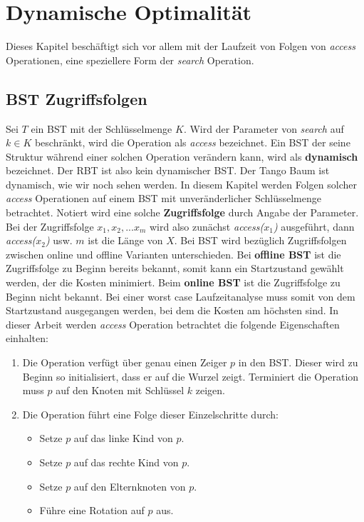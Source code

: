 \documentclass[a4paper,12pt]{article}
\begin{document}
\section{Dynamische Optimalität}
Dieses Kapitel beschäftigt sich vor allem mit der Laufzeit von Folgen von \textit{access} Operationen, eine speziellere Form der \textit{search} Operation.  
\subsection{BST Zugriffsfolgen}
Sei $T$ ein BST mit der Schlüsselmenge $K$. Wird der Parameter von \textit{search} auf $k \in K $ beschränkt, wird  die Operation als \textit{access} bezeichnet. Ein BST der seine Struktur während einer solchen Operation verändern kann, wird als \textbf{dynamisch} bezeichnet. Der RBT ist also kein dynamischer BST. Der Tango Baum ist dynamisch, wie wir noch sehen werden. In diesem Kapitel werden Folgen solcher \textit{access} Operationen auf einem BST mit unveränderlicher Schlüsselmenge betrachtet. Notiert wird eine solche \textbf{Zugriffsfolge} durch Angabe der Parameter. Bei der Zugriffsfolge $x_1,x_2,...x_m$ wird also zunächst \textit{access($x_1$)} ausgeführt, dann \textit{access($x_2$)} usw. $m$ ist die Länge von $X$. Bei BST wird bezüglich Zugriffsfolgen zwischen online und offline Varianten unterschieden. Bei \textbf{offline BST} ist die Zugriffsfolge zu Beginn bereits bekannt, somit kann ein Startzustand gewählt werden, der die Kosten minimiert. Beim \textbf{online BST} ist die Zugriffsfolge zu Beginn nicht bekannt. Bei einer worst case Laufzeitanalyse muss somit von dem Startzustand ausgegangen werden, bei dem die Kosten am höchsten sind.
In dieser Arbeit werden \textit{access} Operation betrachtet die folgende Eigenschaften einhalten:

\begin{enumerate} 
	\item Die Operation verfügt über genau einen Zeiger $p$ in den BST. Dieser wird zu Beginn so initialisiert, dass er auf die Wurzel zeigt. Terminiert die Operation muss $p$ auf den Knoten mit Schlüssel $k$ zeigen.
	\item Die Operation führt eine Folge dieser Einzelschritte durch:
	\begin{itemize}
		\item Setze $p$ auf das linke Kind von $p$.
		\item Setze $p$ auf das rechte Kind von $p$.
		\item Setze $p$ auf den Elternknoten von $p$.
		\item Führe eine Rotation auf $p$ aus.
	\end{itemize}  
	
\end{enumerate}
\end{document}
